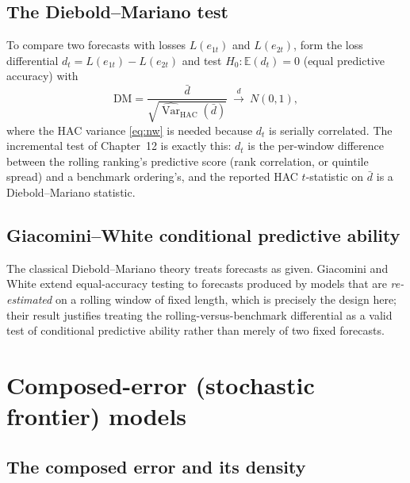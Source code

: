 \subsection{The Diebold--Mariano test}

To compare two forecasts with losses $L(e_{1t})$ and $L(e_{2t})$, form the
loss differential $d_t=L(e_{1t})-L(e_{2t})$ and test $H_0:\mathbb{E}(d_t)=0$
(equal predictive accuracy) with
\begin{equation}\label{eq:dm}
\mathrm{DM}=\frac{\bar d}{\sqrt{\widehat{\operatorname{Var}}_{\mathrm{HAC}}(\bar d)}}
\ \xrightarrow{d}\ N(0,1),
\end{equation}
where the HAC variance \eqref{eq:nw} is needed because $d_t$ is serially
correlated. The incremental test of Chapter~12 is exactly this: $d_t$ is
the per-window difference between the rolling ranking's predictive score
(rank correlation, or quintile spread) and a benchmark ordering's, and the
reported HAC $t$-statistic on $\bar d$ is a Diebold--Mariano statistic.

\subsection{Giacomini--White conditional predictive ability}

The classical Diebold--Mariano theory treats forecasts as given.
Giacomini and White extend equal-accuracy testing to
forecasts produced by models that are \emph{re-estimated} on a rolling
window of fixed length, which is precisely the design here; their result
justifies treating the rolling-versus-benchmark differential as a valid
test of conditional predictive ability rather than merely of two fixed
forecasts.

\section{Composed-error (stochastic frontier) models}\label{prelim-sfa}

\subsection{The composed error and its density}

